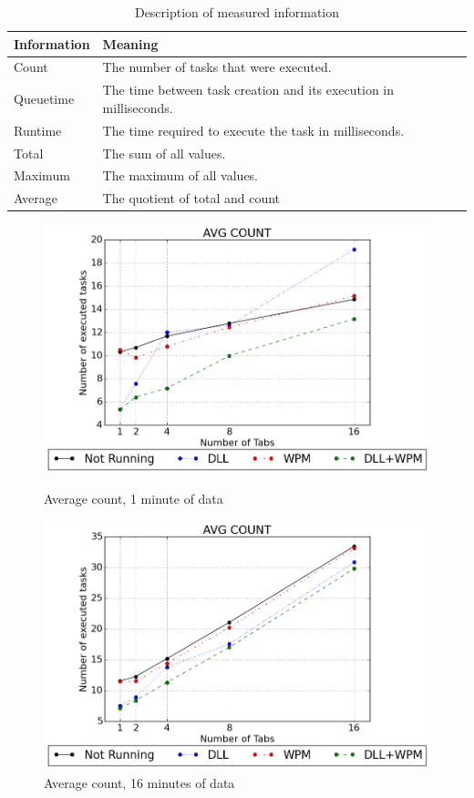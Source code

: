 \begin{table}
\begin{tabularx}{\textwidth}{|l|X|}
\hline
Information & Meaning \\ \hline
Count & The number of tasks that were executed. \\ \hline
Queuetime & The time between task creation and its execution in milliseconds. \\ \hline
Runtime & The time required to execute the task in milliseconds. \\ \hline
Total & The sum of all values. \\ \hline
Maximum & The maximum of all values. \\ \hline
Average & The quotient of total and count \\ \hline
\end{tabularx}
\caption{Description of measured information}
\label{fig:ex1_info}
\end{table}
\begin{figure}[!htbp]
	\centering
    \includegraphics[width=\textwidth,height=0.45\textheight,keepaspectratio]{Evaluation/experiment1/AVG-COUNT-1.png}
    \caption{Average count, 1 minute of data}
    \label{fig:ex1_avgcount_1}

  	\vspace*{\floatsep}
  	
    \includegraphics[width=\textwidth,height=0.45\textheight,keepaspectratio]{Evaluation/experiment1/AVG-COUNT-16.png}
    \caption{Average count, 16 minutes of data}
    \label{fig:ex1_avgcount_16}
\end{figure}
